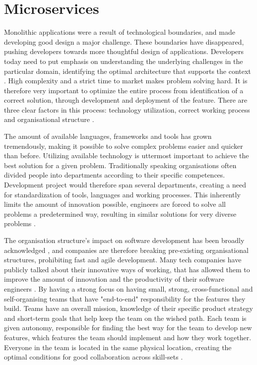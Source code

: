 \section{Microservices}
Monolithic applications were a result of technological boundaries, and made developing good design a major challenge. These boundaries have disappeared, pushing developers towards more thoughtful design of applications. Developers today need to put emphasis on understanding the underlying challenges in the particular domain, identifying the optimal architecture that supports the context \cite[t.~17:00]{evans2016tackling}. High complexity and a strict time to market makes problem solving hard. It is therefore very important to optimize the entire process from identification of a correct solution, through development and deployment of the feature. There are three clear factors in this process: technology utilization, correct working process and organisational structure \cite[t.~12:16]{george2016it} \cite[preface]{newman2015microservices}. 

The amount of available languages, frameworks and tools has grown tremendously, making it possible to solve complex problems easier and quicker than before. Utilizing available technology is uttermost important to achieve the best solution for a given problem. Traditionally speaking organisations often divided people into departments according to their specific competences. Development project would therefore span several departments, creating a need for standardization of tools, languages and working processes. This inherently limits the amount of innovation possible, engineers are forced to solve all problems a predetermined way, resulting in similar solutions for very diverse problems \cite[t.~14:20]{fowler2014microservicesoamonolith} \cite[00:30]{kniberg2014spotify} \cite{murer2015fifteen} \cite[17:00]{meshenberg2016microservices}. 

The organisation structure's impact on software development has been broadly acknowledged \cite{fowler2014microservices, newman2014demystifying}, and companies are therefore breaking pre-existing organisational structures, prohibiting fast and agile development. Many tech companies have publicly talked about their innovative ways of working, that has allowed them to improve the amount of innovation and the productivity of their software engineers \cite[00:30]{kniberg2014spotify} \cite[16:00]{meshenberg2016microservices}. By having a strong focus on having small, strong, cross-functional and self-organising teams that have "end-to-end" responsibility for the features they build. Teams have an overall mission, knowledge of their specific product strategy and short-term goals that help keep the team on the wished path. Each team is given autonomy, responsible for finding the best way for the team to develop new features, which features the team should implement and how they work together. Everyone in the team is located in the same physical location, creating the optimal conditions for good collaboration across skill-sets \cite[01:00]{kniberg2014spotify} \cite{gray2006conversation}.

